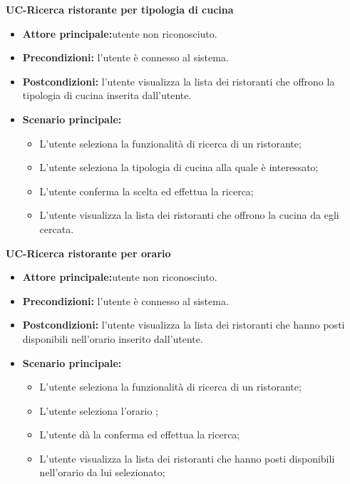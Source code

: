 \textbf{UC-Ricerca ristorante per tipologia di cucina}
\begin{itemize}
\item \textbf{Attore principale:}utente non riconosciuto.
\item \textbf{Precondizioni:} l'utente è connesso al sistema.
\item \textbf{Postcondizioni:} l'utente visualizza la lista dei ristoranti che offrono la tipologia di cucina
inserita dall'utente.
\item \textbf{Scenario principale:}
\begin{itemize}
    \item L'utente seleziona la funzionalità di ricerca di un ristorante;
    \item L'utente seleziona la tipologia di cucina alla quale è interessato;
    \item L'utente conferma la scelta ed effettua la ricerca; 
    \item L'utente visualizza la lista dei ristoranti che offrono la cucina da egli cercata.
\end{itemize}
\end{itemize}

\textbf{UC-Ricerca ristorante per orario}
\begin{itemize}
\item \textbf{Attore principale:}utente non riconosciuto.
\item \textbf{Precondizioni:} l'utente è connesso al sistema.
\item \textbf{Postcondizioni:} l'utente visualizza la lista dei ristoranti che hanno posti disponibili nell'orario inserito 
dall'utente.
\item \textbf{Scenario principale:}
\begin{itemize}
    \item L'utente seleziona la funzionalità di ricerca di un ristorante;
    \item L'utente seleziona l'orario ;
    \item L'utente dà la conferma ed effettua la ricerca;
    \item L'utente visualizza la lista dei ristoranti che hanno posti disponibili nell'orario da lui
    selezionato;
\end{itemize}
\end{itemize}

